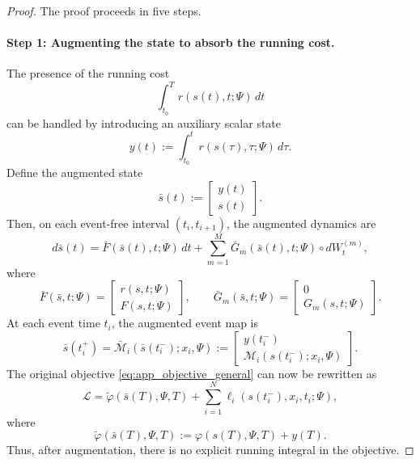 \documentclass[11pt]{article}
\theoremstyle{definition}
\numberwithin{equation}{section}
\numberwithin{theorem}{section}
\numberwithin{proposition}{section}
\numberwithin{lemma}{section}
\numberwithin{corollary}{section}
\numberwithin{definition}{section}
\numberwithin{remark}{section}
\newcommand{\1}{\mathbbm{1}}
\begin{document}
\begin{proof}
The proof proceeds in five steps.

\paragraph{Step 1: Augmenting the state to absorb the running cost.}
The presence of the running cost
\[
\int_{t_0}^T r(s(t),t;\Psi)\,dt
\]
can be handled by introducing an auxiliary scalar state
\[
y(t):=\int_{t_0}^t r(s(\tau),\tau;\Psi)\,d\tau.
\]
Define the augmented state
\[
\bar s(t):=
\begin{bmatrix}
y(t)\\
s(t)
\end{bmatrix}.
\]
Then, on each event-free interval $(t_i,t_{i+1})$, the augmented dynamics are
\begin{equation}
\label{eq:app_augmented_forward}
d\bar s(t)
=
\bar F(\bar s(t),t;\Psi)\,dt
+
\sum_{m=1}^M \bar G_m(\bar s(t),t;\Psi)\circ dW_t^{(m)},
\end{equation}
where
\begin{equation}
\label{eq:app_augmented_FG}
\bar F(\bar s,t;\Psi)
=
\begin{bmatrix}
r(s,t;\Psi)\\
F(s,t;\Psi)
\end{bmatrix},
\qquad
\bar G_m(\bar s,t;\Psi)
=
\begin{bmatrix}
0\\
G_m(s,t;\Psi)
\end{bmatrix}.
\end{equation}
At each event time $t_i$, the augmented event map is
\begin{equation}
\label{eq:app_augmented_event_map}
\bar s(t_i^+)
=
\bar{\mathcal M}_i(\bar s(t_i^-);x_i,\Psi)
:=
\begin{bmatrix}
y(t_i^-)\\
\mathcal M_i(s(t_i^-);x_i,\Psi)
\end{bmatrix}.
\end{equation}
The original objective \eqref{eq:app_objective_general} can now be rewritten as
\begin{equation}
\label{eq:app_augmented_objective}
\mathcal L
=
\tilde \varphi(\bar s(T),\Psi,T)
+
\sum_{i=1}^N \ell_i(s(t_i^-),x_i,t_i;\Psi),
\end{equation}
where
\begin{equation}
\label{eq:app_tilde_phi}
\tilde \varphi(\bar s(T),\Psi,T)
:=
\varphi(s(T),\Psi,T)+y(T).
\end{equation}
Thus, after augmentation, there is no explicit running integral in the objective.


\end{proof}
\end{document}
